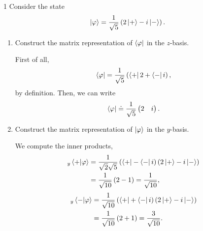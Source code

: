 \documentclass[11pt]{article}
\begin{document}
\begin{problem}{1}
  Consider the state
  \begin{equation}
  \label{eq:1}
  \ket{\varphi} = \frac{1}{\sqrt{5}} \left( 2 \ket{+} - i \ket{-} \right).
  \end{equation}
  \begin{enumerate}[label=(\alph*)]
    \item Construct the matrix representation of \( \bra{\varphi} \) in the \( z \)-basis.
          \begin{answer}
            First of all,
            \begin{equation}
            \label{eq:4}
            \bra{\varphi} = \frac{1}{\sqrt{5}} \left( \bra{+}2 + \bra{-}i \right),
          \end{equation}
          by definition.
          Then, we can write
          \begin{equation}
          \label{eq:5}
          \bra{\varphi} \doteq \frac{1}{\sqrt{5}} \begin{pmatrix}
2  & i
 \end{pmatrix}.
          \end{equation}
          \end{answer}
    \item Construct the matrix representation of \( \ket{\varphi} \) in the \( y \)-basis.
          \begin{answer}
            We compute the inner products,
            \begin{equation}
              \begin{aligned}
            \label{eq:6}
                _y\ip{+}{\varphi} &= \frac{1}{\sqrt{2}\sqrt{5}}\left( \bra{+} - \bra{-}i \right)\left( 2\ket{+} - i \ket{-} \right) \\
                &= \frac{1}{\sqrt{10}} \left( 2 - 1 \right) = \frac{1}{\sqrt{10}},
                \end{aligned}
            \end{equation}
            \begin{equation}
            \label{eq:7}
            \begin{aligned}
              _y\ip{-}{\varphi} &= \frac{1}{\sqrt{10}} \left( \bra{+} + \bra{-}i \right)\left( 2 \ket{+} - i \ket{-} \right) \\
              &= \frac{1}{\sqrt{10}} \left( 2 + 1 \right) = \frac{3}{\sqrt{10}}.
            \end{aligned}
            \end{equation}


\end{answer}
\end{enumerate}
\end{problem}
\end{document}

